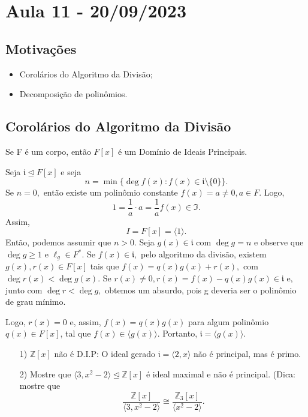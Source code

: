 \documentclass[AlgebraII/algebraII_notes.tex]{subfiles}
\begin{document}
\section{Aula 11 - 20/09/2023}
\subsection{Motivações}
\begin{itemize}
	\item Corolários do Algoritmo da Divisão;
	\item Decomposição de polinômios.
\end{itemize}
\subsection{Corolários do Algoritmo da Divisão}
\begin{prop*}
	Se F é um corpo, então \(F[x]\) é um Domínio de Ideais Principais.
\end{prop*}
\begin{proof*}
	Seja \(\mathfrak{i} \trianglelefteq{F[x]}\) e seja
	\[
		n = \min\{\deg{f(x)}: f(x)\in \mathfrak{i}\setminus{\{0\}}\}.
	\]
	Se \(n=0,\) então existe um polinômio constante \(f(x) = a\neq 0, a\in F.\) Logo,
	\[
		1 = \frac{1}{a}\cdot a = \frac{1}{a}f(x)\in \mathfrak{I}.
	\]
	Assim,
	\[
		I = F[x] = \langle 1 \rangle.
	\]
	Então, podemos assumir que \(n > 0\). Seja \(g(x)\in \mathfrak{i}\) com \(\deg{g} = n\) e observe que
	\(\deg{g}\geq 1\) e \(\ell_{g}\in F^{*}\). Se \(f(x)\in \mathfrak{i},\) pelo algoritmo da divisão, existem
	\(g(x), r(x)\in F[x]\) tais que \(f(x) = q(x)g(x) + r(x),\) com \(\deg{r(x)} < \deg{g(x)}.\) Se \(r(x)\neq0, r(x) = f(x)
	- q(x)g(x)\in \mathfrak{i}\) e, junto com \(\deg{r} < \deg{g},\) obtemos um absurdo, pois g deveria ser o polinômio de
	grau mínimo.

	Logo, \(r(x) = 0\) e, assim, \(f(x) = q(x)g(x)\) para algum polinômio \(q(x)\in F[x]\), tal que \(f(x)\in \langle g(x) \rangle.\)
	Portanto, \(\mathfrak{i} = \langle g(x) \rangle.\) \qedsymbol
\end{proof*}
\begin{example}[Exercício]
	\begin{itemize}
		\item[1)] \(\mathbb{Z}[x]\) não é D.I.P: O ideal gerado \(\mathfrak{i} = \langle 2, x \rangle\) não é principal, mas é primo.
		\item[2)] Mostre que \(\langle 3, x^{2}-2 \rangle \trianglelefteq{\mathbb{Z}[x]}\) é ideal maximal e não é principal. (Dica:
		      mostre que
		      \[
			      \frac{\mathbb{Z}[x]}{\langle 3, x^{2}-2 \rangle}\cong{\frac{\mathbb{Z}_{3}[x]}{\langle x^{2}-2 \rangle}}.
		      \]
	\end{itemize}
\end{example}
\end{document}
